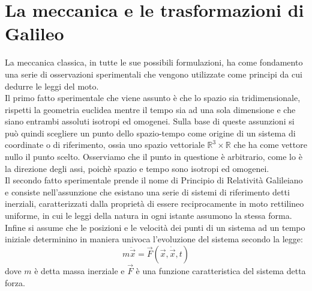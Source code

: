 \section{La meccanica e le trasformazioni di Galileo}
La meccanica classica, in tutte le sue possibili formulazioni, ha come fondamento una serie di osservazioni sperimentali che vengono utilizzate come principi da cui dedurre le leggi del moto.\\

Il primo fatto sperimentale che viene assunto è che lo spazio sia tridimensionale, rispetti la geometria euclidea mentre il tempo sia ad una sola dimensione e che siano entrambi assoluti isotropi ed omogenei.
Sulla base di queste assunzioni si può quindi scegliere un punto dello spazio-tempo come origine di un sistema di coordinate o di riferimento, ossia uno spazio vettoriale $\mathbb{R}^3\times\mathbb{R}$ che ha come vettore nullo il punto scelto. Osserviamo che il punto in questione è arbitrario, come lo è la direzione degli assi, poichè spazio e tempo sono isotropi ed omogenei.\\

Il secondo fatto sperimentale prende il nome di Principio di Relatività Galileiano e consiste nell'assunzione che esistano una serie di sistemi di riferimento detti inerziali, caratterizzati dalla proprietà di essere reciprocamente in moto rettilineo uniforme, in cui le leggi della natura in ogni istante assumono la stessa forma.\\

Infine si assume che le posizioni e le velocità dei punti di un sistema ad un tempo iniziale determinino in maniera univoca l'evoluzione del sistema secondo la legge:
\begin{equation}
	m\ddot{\vec{x}}=\vec{F}(\vec{x},\dot{\vec{x}},t)
	\label{equazioneDiNewton}
\end{equation}
dove $m$ è detta massa inerziale e $\vec{F}$ è una funzione caratteristica del sistema detta forza.\\

